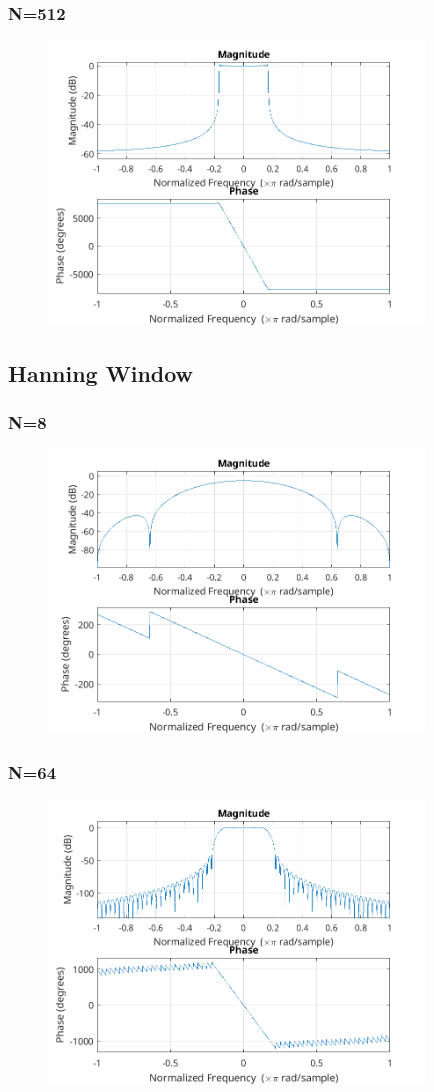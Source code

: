 \documentclass{article}
\begin{document}
  \subsubsection{N=512}
  \begin{figure}[!ht]
  \includegraphics[width=10cm]{freqz_tri_512.png}
  \end{figure} 
\subsection{Hanning Window}
  \subsubsection{N=8}
  \begin{figure}[!ht]
  \includegraphics[width=10cm]{freqz_han_8.png}
  \end{figure}
  \subsubsection{N=64}
  \begin{figure}[!ht]
  \includegraphics[width=10cm]{freqz_han_64.png}
  \end{figure}
\end{document}
